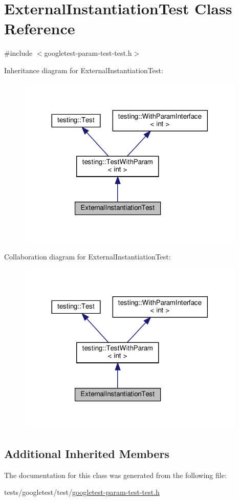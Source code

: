 \hypertarget{classExternalInstantiationTest}{}\section{External\+Instantiation\+Test Class Reference}
\label{classExternalInstantiationTest}


{\ttfamily \#include $<$googletest-\/param-\/test-\/test.\+h$>$}



Inheritance diagram for External\+Instantiation\+Test\+:\nopagebreak
\begin{figure}[H]
\begin{center}
\leavevmode
\includegraphics[width=308pt]{classExternalInstantiationTest__inherit__graph}
\end{center}
\end{figure}


Collaboration diagram for External\+Instantiation\+Test\+:\nopagebreak
\begin{figure}[H]
\begin{center}
\leavevmode
\includegraphics[width=308pt]{classExternalInstantiationTest__coll__graph}
\end{center}
\end{figure}
\subsection*{Additional Inherited Members}


The documentation for this class was generated from the following file\+:\begin{DoxyCompactItemize}
\item 
tests/googletest/test/\hyperlink{googletest-param-test-test_8h}{googletest-\/param-\/test-\/test.\+h}\end{DoxyCompactItemize}
